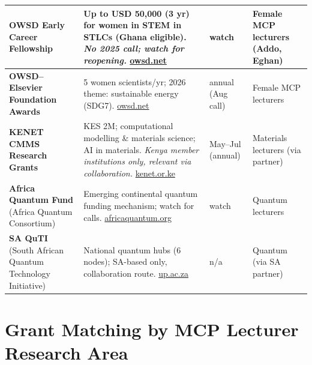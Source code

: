 \documentclass[11pt,a4paper]{article}
\begin{document}
\begin{longtable}{@{}p{3.3cm}p{5.6cm}p{2.2cm}p{2.8cm}@{}}
\midrule
\textbf{OWSD Early Career Fellowship} & Up to \textbf{USD 50{,}000} (3 yr) for women in STEM in STLCs (Ghana eligible). \emph{No 2025 call; watch for reopening.} \href{https://owsd.net/early-career-fellowship}{owsd.net} & watch & Female MCP lecturers (Addo, Eghan) \\
\midrule
\textbf{OWSD--Elsevier Foundation Awards} & 5 women scientists/yr; 2026 theme: sustainable energy (SDG7). \href{https://owsd.net/awards}{owsd.net} & annual (Aug call) & Female MCP lecturers \\
\midrule
\textbf{KENET CMMS Research Grants} & KES 2M; computational modelling \& materials science; AI in materials. \emph{Kenya member institutions only, relevant via collaboration.} \href{https://www.kenet.or.ke/content/call-proposals-research-grants-computational-modeling-and-materials-science-20262027}{kenet.or.ke} & May--Jul (annual) & Materials lecturers (via partner) \\
\midrule
\textbf{Africa Quantum Fund} (Africa Quantum Consortium) & Emerging continental quantum funding mechanism; watch for calls. \href{https://africaquantum.org/}{africaquantum.org} & watch & Quantum lecturers \\
\midrule
\textbf{SA QuTI} (South African Quantum Technology Initiative) & National quantum hubs (6 nodes); SA-based only, collaboration route. \href{https://www.up.ac.za/news/secures-national-quantum-technology-hub-major-boost-sa-innovation}{up.ac.za} & n/a & Quantum (via SA partner) \\
\bottomrule
\end{longtable}

\section{Grant Matching by MCP Lecturer Research Area}
\end{document}
